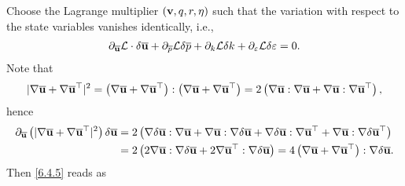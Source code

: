 \documentclass[oneside,11pt]{book}
\numberwithin{equation}{section}
\begin{document}
Choose the Lagrange multiplier $({\bf v},q,r,\eta)$ such that the variation with respect to the state variables vanishes identically, i.e.,
\begin{align*}
    \label{6.4.5}
    \partial_{\overline{\bf u}}\mathcal{L}\cdot\delta \overline{\bf u} + \partial_{\overline{p}}\mathcal{L}\delta \overline{p} + \partial_k\mathcal{L}\delta k + \partial_\varepsilon\mathcal{L}\delta\varepsilon = 0.
\end{align*}
Note that 
\begin{align*}
    |\nabla\overline{\bf u} + \nabla\overline{\bf u}^\top|^2 = \left(\nabla\overline{\bf u} + \nabla\overline{\bf u}^\top\right):\left(\nabla\overline{\bf u} + \nabla\overline{\bf u}^\top\right) = 2\left(\nabla\overline{\bf u}:\nabla\overline{\bf u} + \nabla\overline{\bf u}:\nabla\overline{\bf u}^\top\right),
\end{align*}
hence
\begin{align*}
    \partial_{\overline{\bf u}}\left(|\nabla\overline{\bf u} + \nabla\overline{\bf u}^\top|^2\right)\delta\overline{\bf u} &= 2\left(\nabla\delta\overline{\bf u}:\nabla\overline{\bf u} +\nabla\overline{\bf u}:\nabla\delta\overline{\bf u} + \nabla\delta\overline{\bf u}:\nabla\overline{\bf u}^\top + \nabla\overline{\bf u}:\nabla\delta\overline{\bf u}^\top\right)\\
    &= 2\left(2\nabla\overline{\bf u}:\nabla\delta\overline{\bf u} + 2\nabla\overline{\bf u}^\top:\nabla\delta\overline{\bf u}\right) = 4\left(\nabla\overline{\bf u} + \nabla\overline{\bf u}^\top\right):\nabla\delta\overline{\bf u}.
\end{align*}
Then \eqref{6.4.5} reads as
\end{document}
